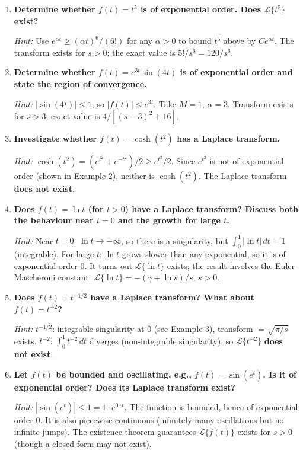 \documentclass[12pt,a4paper]{article}
\begin{document}
\begin{enumerate}[label=\textbf{P\arabic*.}]

\item \textbf{Determine whether $f(t) = t^5$ is of exponential order. Does $\mathcal{L}\{t^5\}$ exist?}

\textit{Hint:} Use $e^{\alpha t} \geq (\alpha t)^6/(6!)$ for any $\alpha > 0$ to bound $t^5$ above by $C e^{\alpha t}$. The transform exists for $s > 0$; the exact value is $5!/s^6 = 120/s^6$.

\item \textbf{Determine whether $f(t) = e^{3t}\sin(4t)$ is of exponential order and state the region of convergence.}

\textit{Hint:} $|\sin(4t)| \leq 1$, so $|f(t)| \leq e^{3t}$. Take $M=1$, $\alpha = 3$. Transform exists for $s > 3$; exact value is $4/[(s-3)^2 + 16]$.

\item \textbf{Investigate whether $f(t) = \cosh(t^2)$ has a Laplace transform.}

\textit{Hint:} $\cosh(t^2) = (e^{t^2} + e^{-t^2})/2 \geq e^{t^2}/2$. Since $e^{t^2}$ is not of exponential order (shown in Example 2), neither is $\cosh(t^2)$. The Laplace transform \textbf{does not exist}.

\item \textbf{Does $f(t) = \ln t$ (for $t > 0$) have a Laplace transform? Discuss both the behaviour near $t=0$ and the growth for large $t$.}

\textit{Hint:} Near $t=0$: $\ln t \to -\infty$, so there is a singularity, but $\int_0^1 |\ln t|\, dt = 1$ (integrable). For large $t$: $\ln t$ grows slower than any exponential, so it is of exponential order 0. It turns out $\mathcal{L}\{\ln t\}$ exists; the result involves the Euler-Mascheroni constant: $\mathcal{L}\{\ln t\} = -(\gamma + \ln s)/s$, $s>0$.

\item \textbf{Does $f(t) = t^{-1/2}$ have a Laplace transform? What about $f(t) = t^{-2}$?}

\textit{Hint:} $t^{-1/2}$: integrable singularity at 0 (see Example 3), transform $= \sqrt{\pi/s}$ exists. $t^{-2}$: $\int_0^1 t^{-2}\, dt$ diverges (non-integrable singularity), so $\mathcal{L}\{t^{-2}\}$ \textbf{does not exist}.

\item \textbf{Let $f(t)$ be bounded and oscillating, e.g., $f(t) = \sin(e^t)$. Is it of exponential order? Does its Laplace transform exist?}

\textit{Hint:} $|\sin(e^t)| \leq 1 = 1 \cdot e^{0 \cdot t}$. The function is bounded, hence of exponential order 0. It is also piecewise continuous (infinitely many oscillations but no infinite jumps). The existence theorem guarantees $\mathcal{L}\{f(t)\}$ exists for $s > 0$ (though a closed form may not exist).

\end{enumerate}
\end{document}
